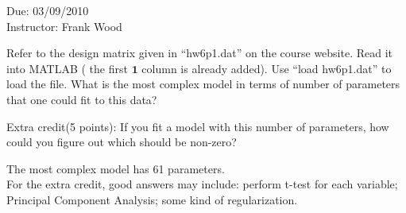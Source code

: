\documentclass[12pt]{article}
\begin{document}

 \begin{center}
 Due: 03/09/2010\\
  Instructor: Frank Wood
 \end{center}
{} \finishfirstpage


 {
 Refer to the design matrix given in ``hw6p1.dat'' on the course website.
 Read it into MATLAB ( the first  $\textbf{1}$ column is already added). Use ``load hw6p1.dat'' to load the file. What is the most complex model in terms of number of parameters
 that one could fit to this data?

 Extra credit(5 points): If you fit a model with this number of parameters, how could  you figure out which  should be non-zero?
 }
 { \vfill
  \answer
} { 
The most complex model has 61 parameters. \\
For the extra credit, good answers may include: perform t-test for each variable; Principal Component Analysis; some kind of regularization.
}
\end{document}
